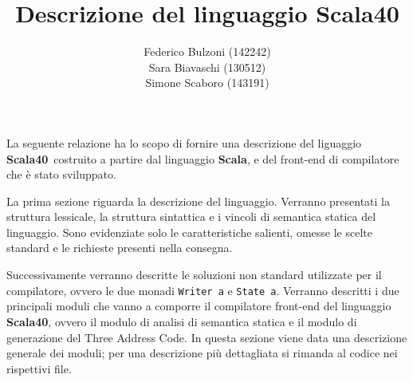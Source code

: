 \documentclass{article}
\title{Descrizione del linguaggio Scala40}
\date{}
\author{Federico Bulzoni (142242)\\
Sara Biavaschi (130512)\\
Simone Scaboro (143191)}
\newcommand{\SBF}{\textbf{Scala40}}
\begin{document}
    \maketitle

La seguente relazione ha lo scopo di fornire una descrizione del liguaggio \SBF\, costruito a partire dal linguaggio {\bf Scala}, e del front-end di compilatore che è stato sviluppato.

La prima sezione riguarda la descrizione del linguaggio. Verranno presentati la struttura lessicale, la struttura sintattica e i vincoli di semantica statica del linguaggio. Sono evidenziate solo le caratteristiche salienti, omesse le scelte standard e le richieste presenti nella consegna.

Successivamente verranno descritte le soluzioni non standard utilizzate per il compilatore, ovvero le due monadi {\tt Writer a} e {\tt State a}. Verranno descritti i due principali moduli che vanno a comporre il compilatore front-end del linguaggio \SBF, ovvero il modulo di analisi di semantica statica e il modulo di generazione del Three Address Code. In questa sezione viene data una descrizione generale dei moduli; per una descrizione più dettagliata si rimanda al codice nei rispettivi file. 

  


\end{document}
